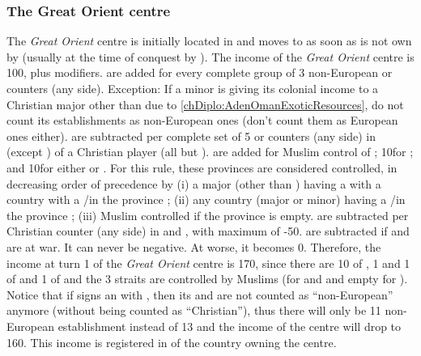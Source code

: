 \subsubsection{The Great Orient centre}
\aparag The \emph{Great Orient} centre is initially located in
\provinceNil and moves to \provinceIzmir as soon as \provinceNil is not
own by \paysEgypte (usually at the time of conquest by \TUR).
\aparag The income of the \emph{Great Orient} centre is 100\ducats, plus
modifiers.
\ducats are added for every complete group of 3 non-European
\COL or \TP counters (any side).
\bparag Exception: If a minor is giving its colonial income to a
Christian major other than \VEN due to
\ref{chDiplo:AdenOmanExoticResources}, do not count its establishments
as non-European ones (don't count them as European ones either).
\ducats are subtracted per complete set of 5 \COL or \TP
counters (any side) in  (except ) of
a Christian player (all but \TUR).
\ducats are added for Muslim control of ;
10\ducats for ; and 10\ducats for either
 or . For this rule, these
provinces are considered controlled, in decreasing order of precedence
by (i) a major (other than \VEN) having a \dipAT with a country with a
\COL/\TP in the province ; (ii) any country (major or minor) having a
\COL/\TP in the province ; (iii) Muslim controlled if the province is
empty.
\ducats are subtracted per Christian \TradeFLEET counter (any
side) in  and , with maximum of -50\ducats.
\ducats are subtracted if \TUR and  are at war.
\bparag It can never be negative. At worse, it becomes 0\ducats.
\bparag Therefore, the income at turn 1 of the \emph{Great Orient}
centre is 170\ducats, since there are 10 \TP of , 1 \TP
and 1 \COL of  and 1 \COL of  and the 3 straits
are controlled by Muslims (\paysGujarat for  and
\provinceOrmuz and empty for \provinceSocotra).
\bparag Notice that if \POR signs an \dipAT with \paysAden, then its
\COL and \TP are not counted as ``non-European'' anymore (without being
counted as ``Christian''), thus there will only be 11 non-European
establishment instead of 13 and the income of the centre will drop to
160\ducats.
\bparag This income is registered in 
of the country owning the centre.

